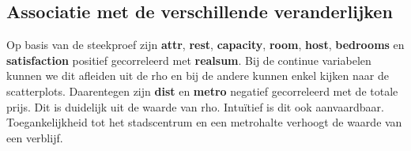 \documentclass[a4paper]{kulakarticle}
\begin{document}
	\subsection{Associatie met de verschillende veranderlijken}
	
	Op basis van de steekproef zijn \textbf{attr}, \textbf{rest}, \textbf{capacity}, \textbf{room}, \textbf{host}, \textbf{bedrooms} en \textbf{satisfaction} positief gecorreleerd met \textbf{realsum}. Bij de continue variabelen kunnen we dit afleiden uit de rho en bij de andere kunnen enkel kijken naar de scatterplots. Daarentegen zijn \textbf{dist} en \textbf{metro} negatief gecorreleerd met de totale prijs. Dit is duidelijk uit de waarde van rho. Intuïtief is dit ook aanvaardbaar. Toegankelijkheid tot het stadscentrum en een metrohalte verhoogt de waarde van een verblijf.
	
\end{document}
